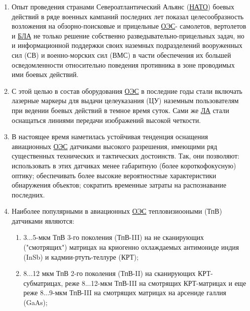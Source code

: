 \begin{enumerate}
	\item Опыт проведения странами Североатлантический Альянс (\hyperref[acroNATO]{НАТО}) боевых действий в ряде военных кампаний последних лет показал целесообразность возложения на обзорно-поисковые и прицельные \hyperref[acroEOS]{ОЭС}- самолетов, вертолетов и  \hyperref[acroUAV]{БЛА} не только решение собственно разведывательно-прицельных задач, но и информационной поддержки своих наземных подразделений вооруженных сил (СВ) и военно-морских сил (ВМС) в части обеспечения их большей осведомленности относительно поведения противника в зоне проводимых ими боевых действий.
	\item С этой целью в состав оборудования  \hyperref[acroEOS]{ОЭС} в последние годы стали включать лазерные маркеры для выдачи целеуказания (ЦУ) наземным пользователям при ведении боевых действий в темное время суток. Сами же  \hyperref[acroLA]{ЛА} стали оснащаться линиями передачи изображений высокой четкости.
	\item В настоящее время наметилась устойчивая тенденция оснащения авиационных  \hyperref[acroEOS]{ОЭС} датчиками высокого разрешения, имеющими ряд существенных технических и тактических достоинств. Так, они позволяют: использовать в этих датчиках менее габаритную (более короткофокусную) оптику; обеспечивать более высокие вероятностные характеристики обнаружения объектов; сократить временные затраты на распознавание последних. 
	\item Наиболее популярными в авиационных  \hyperref[acroEOS]{ОЭС} тепловизиооными (ТпВ) датчиками являются:
	\begin{enumerate}
		\item 3...5-мкм ТпВ 3-го поколения (ТпВ-III) на не сканирующих ("смотрящих") матрицах на криогенно охлаждаемых антимониде индия (InSb) и кадмии-ртуть-теллуре (КРТ); 
		\item 8...12 мкм ТпВ 2-го поколения (ТпВ-II) на сканирующих КРТ-субматрицах, реже 8...12-мкм ТпВ-III на смотрящих КРТ-матрицах и еще реже 8...9-мкм ТпВ-III на смотрящих матрицах на арсениде галлия (GaAs); 
		 

\end{enumerate}
\end{enumerate}
